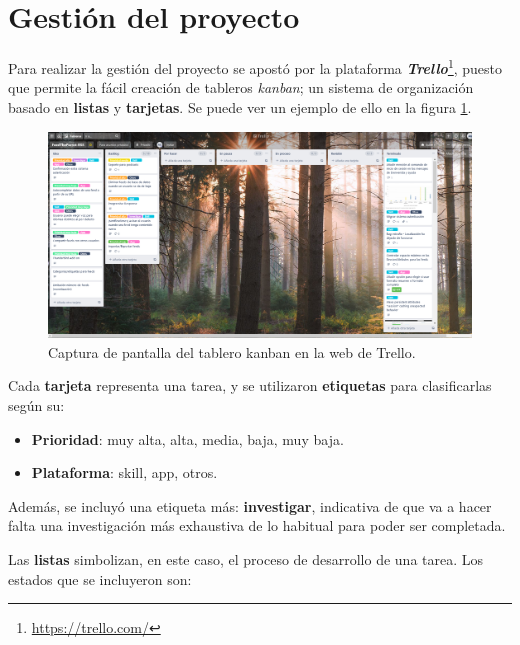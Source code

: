 \documentclass[11pt,spanish,listoffigures,listoftables,table,hyphens,dvipsnames]{tfgetsinf}
\begin{document}
\section{Gestión del proyecto}
\label{seccion:gestion-proyecto}

Para realizar la gestión del proyecto se apostó por la plataforma \textbf{\emph{Trello}}\footnote{\url{https://trello.com/}}, puesto que permite la fácil creación de tableros \emph{kanban}; un sistema de organización basado en \textbf{listas} y \textbf{tarjetas}. Se puede ver un ejemplo de ello en la figura \ref{figura:gestion-proyecto-trello}.

\begin{figure}[ht]
   \centering
   \includegraphics[width=\textwidth]{gestion-proyecto-trello.png}
   \caption{Captura de pantalla del tablero kanban en la web de Trello.}
   \label{figura:gestion-proyecto-trello}
\end{figure}

Cada \textbf{tarjeta} representa una tarea, y se utilizaron \textbf{etiquetas} para clasificarlas según su:

\begin{itemize}
   \item \textbf{Prioridad}: muy alta, alta, media, baja, muy baja.
   \item \textbf{Plataforma}: skill, app, otros.
\end{itemize}

Además, se incluyó una etiqueta más: \textbf{investigar}, indicativa de que va a hacer falta una investigación más exhaustiva de lo habitual para poder ser completada.


Las \textbf{listas} simbolizan, en este caso, el proceso de desarrollo de una tarea. Los estados que se incluyeron son:
\end{document}
